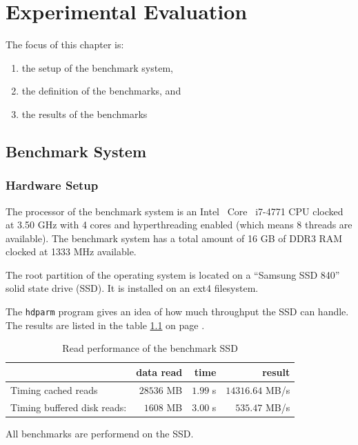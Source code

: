 \chapter{Experimental Evaluation}

The focus of this chapter is:
\begin{enumerate}
\item the setup of the benchmark system,
\item the definition of the benchmarks, and
\item the results of the benchmarks
\end{enumerate}

\section{Benchmark System}
  \subsection{Hardware Setup}

The processor of the benchmark system is an Intel\textregistered~ Core\texttrademark~ i7-4771 CPU clocked at 3.50 GHz with 4 cores and hyperthreading enabled (which means 8 threads are available).
The benchmark system has a total amount of 16 GB of DDR3 RAM clocked at 1333 MHz available.

The root partition of the operating system is located on a ``Samsung SSD 840'' solid state drive (SSD).
It is installed on an ext4 filesystem.

The \texttt{hdparm} program gives an idea of how much throughput the SSD can handle. The results are listed in the table \ref{eval-ssd} on page \pageref{eval-ssd}.

\begin{table}[h]
\centering
\caption{Read performance of the benchmark SSD}
\label{eval-ssd}
\begin{tabular}{lrrr}
\textbf{}                   & \textbf{data read} & \textbf{time} & \textbf{result} \\ \hline
Timing cached reads         & $28536$ MB         & $1.99$ s      & $14316.64$ MB/s \\
Timing buffered disk reads: & $1608$ MB          & $3.00$ s      & $535.47$ MB/s   \\ \hline
\end{tabular}
\end{table}

All benchmarks are performend on the SSD.

